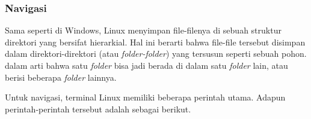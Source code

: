\subsubsection{Navigasi}
\label{sec:commandline-linux-nav}

Sama seperti di Windows, Linux menyimpan file-filenya di sebuah struktur direktori yang bersifat hierarkial. Hal ini berarti bahwa file-file tersebut disimpan dalam direktori-direktori (atau \textit{folder-folder}) yang tersusun seperti sebuah pohon. dalam arti bahwa satu \textit{folder} bisa jadi berada di dalam satu \textit{folder} lain, atau berisi beberapa \textit{folder} lainnya.\cite{shottsjr:2019:linuxcommandline}

Untuk navigasi, terminal Linux memiliki beberapa perintah utama. Adapun perintah-perintah tersebut adalah sebagai berikut.

